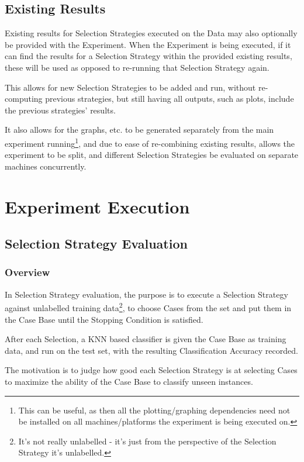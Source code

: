 \documentclass[a4paper,11pt]{report}
\begin{document}
\subsection{Existing Results}
Existing results for Selection Strategies executed on the Data may also optionally be provided with the Experiment. When the Experiment is being executed, if it can find the results for a Selection Strategy within the provided existing results, these will be used as opposed to re-running that Selection Strategy again.

This allows for new Selection Strategies to be added and run, without re-computing previous strategies, but still having all outputs, such as plots, include the previous strategies' results.

It also allows for the graphs, etc. to be generated separately from the main experiment running\footnote{This can be useful, as then all the plotting/graphing dependencies need not be installed on all machines/platforms the experiment is being executed on.}, and due to ease of re-combining existing results, allows the experiment to be split, and different Selection Strategies be evaluated on separate machines concurrently.

\pagebreak

\section{Experiment Execution}
\subsection{Selection Strategy Evaluation}
\subsubsection{Overview}
In Selection Strategy evaluation, the purpose is to execute a Selection Strategy against unlabelled training data\footnote{It's not really unlabelled - it's just from the perspective of the Selection Strategy it's unlabelled.}, to choose Cases from the set and put them in the Case Base until the Stopping Condition is satisfied.

After each Selection, a KNN based classifier is given the Case Base as training data, and run on the test set, with the resulting Classification Accuracy recorded.

The motivation is to judge how good each Selection Strategy is at selecting Cases to maximize the ability of the Case Base to classify unseen instances.
\end{document}
